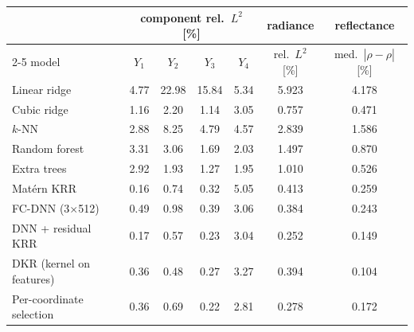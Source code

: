 \begin{tabular}{lcccccc}
\toprule
 & \multicolumn{4}{c}{component rel.\ $L^2$ [\%]} & radiance & reflectance \\
\cmidrule(lr){2-5}
model & $Y_1$ & $Y_2$ & $Y_3$ & $Y_4$ & rel.\ $L^2$ [\%] & med.\ $|\hat\rho-\rho|$ [\%] \\
\midrule
Linear ridge & 4.77 & 22.98 & 15.84 & 5.34 & 5.923 & 4.178 \\
Cubic ridge & 1.16 & 2.20 & 1.14 & 3.05 & 0.757 & 0.471 \\
$k$-NN & 2.88 & 8.25 & 4.79 & 4.57 & 2.839 & 1.586 \\
Random forest & 3.31 & 3.06 & 1.69 & 2.03 & 1.497 & 0.870 \\
Extra trees & 2.92 & 1.93 & 1.27 & 1.95 & 1.010 & 0.526 \\
Mat\'ern KRR & 0.16 & 0.74 & 0.32 & 5.05 & 0.413 & 0.259 \\
FC-DNN (3$\times$512) & 0.49 & 0.98 & 0.39 & 3.06 & 0.384 & 0.243 \\
DNN + residual KRR & 0.17 & 0.57 & 0.23 & 3.04 & 0.252 & 0.149 \\
DKR (kernel on features) & 0.36 & 0.48 & 0.27 & 3.27 & 0.394 & 0.104 \\
Per-coordinate selection & 0.36 & 0.69 & 0.22 & 2.81 & 0.278 & 0.172 \\
\bottomrule
\end{tabular}

